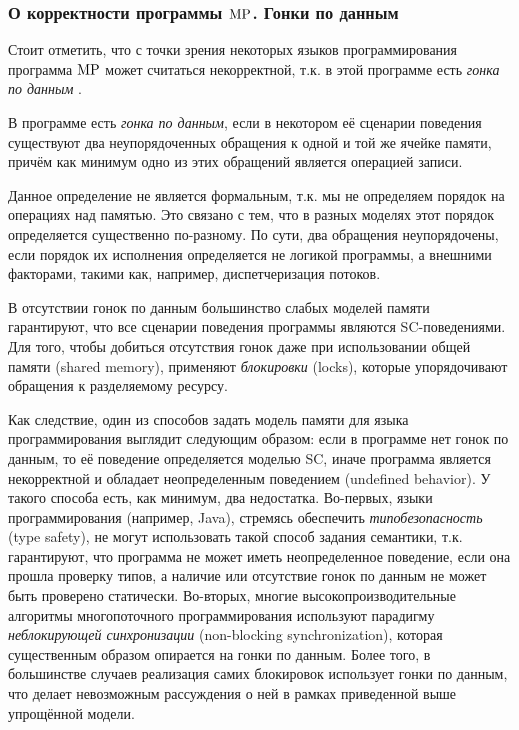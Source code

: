 \subsubsection{О корректности программы ${\rm MP}$. Гонки по данным}
Стоит отметить, что с точки зрения некоторых языков программирования программа ${\rm MP}$ может считаться некорректной,
т.к. в этой программе есть \emph{гонка по данным} \cite{Unger:ITC95}.
\begin{definition}
  \label{def:datarace}
  В программе есть \emph{гонка по данным}, если в некотором её сценарии поведения существуют два неупорядоченных
  обращения к одной и той же ячейке памяти, причём как минимум одно из этих обращений является операцией записи.
\end{definition}
Данное определение не является формальным, т.к. мы не определяем порядок на операциях над памятью.
Это связано с тем, что в разных моделях этот порядок определяется существенно по-разному.
По сути, два обращения неупорядочены, если порядок их исполнения определяется не логикой
программы, а внешними факторами, такими как, например, диспетчеризация потоков.

В отсутствии гонок по данным большинство слабых моделей памяти гарантируют, что все сценарии поведения программы
являются SC-поведениями. Для того, чтобы добиться отсутствия гонок даже при использовании общей памяти (shared memory),
применяют \emph{блокировки} (locks), которые упорядочивают обращения к разделяемому ресурсу.

Как следствие, один из способов задать модель памяти для языка программирования выглядит следующим образом:
если в программе нет гонок по данным, то её поведение определяется моделью SC, иначе программа является некорректной и
обладает неопределенным поведением (undefined behavior).
У такого способа есть, как минимум, два недостатка.
Во-первых, языки программирования  (например, Java), стремясь обеспечить
\emph{типобезопасность} (type safety), не могут использовать такой способ задания семантики,
т.к. гарантируют, что программа не может иметь неопределенное поведение, если она прошла проверку типов, а
наличие или отсутствие гонок по данным не может быть проверено статически.
Во-вторых, многие высокопроизводительные алгоритмы многопоточного программирования используют парадигму
\emph{неблокирующей синхронизации} (non-blocking synchronization), которая существенным образом опирается
на гонки по данным. Более того, в большинстве случаев реализация самих блокировок использует гонки по данным,
что делает невозможным рассуждения о ней в рамках приведенной выше упрощённой модели.

